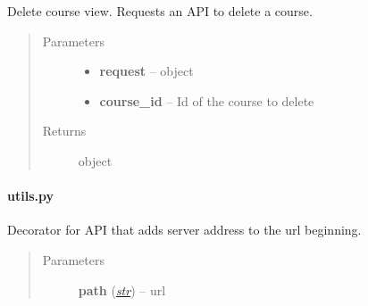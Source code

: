 \documentclass[letterpaper,10pt,english]{sphinxmanual}
\begin{document}

\begin{fulllineitems}
\label{web_portal:core.courses.views.delete_course}
Delete course view. Requests an API to delete a course.
\begin{quote}\begin{description}
\item[{Parameters}] \leavevmode\begin{itemize}
\item {} 
\textbf{request} --  object

\item {} 
\textbf{course\_id} -- Id of the course to delete

\end{itemize}

\item[{Returns}] \leavevmode
{} object

\end{description}\end{quote}

\end{fulllineitems}



\paragraph{utils.py}
\label{web_portal:utils-py}

\begin{fulllineitems}
\label{web_portal:core.courses.utils.base_request_url}
Decorator for API that adds server address to the url beginning.
\begin{quote}\begin{description}
\item[{Parameters}] \leavevmode
\textbf{path} (\href{http://docs.python.org/library/functions.html\#str}{\emph{str}}) -- url

\end{description}\end{quote}

\end{fulllineitems}
\end{document}
